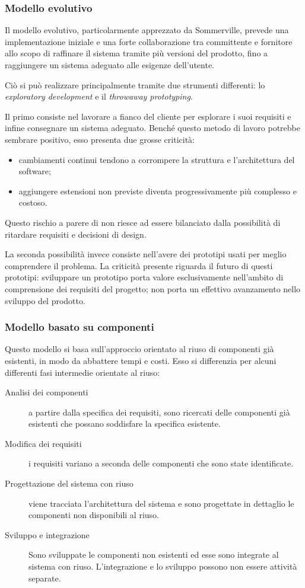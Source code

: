 \subsubsection{Modello evolutivo}
Il modello evolutivo, particolarmente apprezzato da Sommerville, prevede una implementazione iniziale e una forte collaborazione tra committente e fornitore allo scopo di raffinare il sistema tramite più versioni del prodotto, fino a raggiungere un sistema adeguato alle esigenze dell'utente.

Ciò si può realizzare principalmente tramite due strumenti differenti: lo \emph{exploratory development} e il \emph{throwaway prototyping}.

Il primo consiste nel lavorare a fianco del cliente per esplorare i suoi requisiti e infine consegnare un sistema adeguato. Benché questo metodo di lavoro potrebbe sembrare positivo, esso presenta due grosse criticità: 
\begin{itemize}
	\item cambiamenti continui tendono a corrompere la struttura e l'architettura del software;
	\item aggiungere estensioni non previste diventa progressivamente più complesso e costoso. 
\end{itemize}
Questo rischio a parere di \hx{} non riesce ad essere bilanciato dalla possibilità di ritardare requisiti e decisioni di design.

La seconda possibilità invece consiste nell'avere dei prototipi usati per meglio comprendere il problema. La criticità presente riguarda il futuro di questi prototipi: sviluppare un prototipo porta valore esclusivamente nell'ambito di comprensione dei requisiti del progetto; non porta un effettivo avanzamento nello sviluppo del prodotto.

\subsubsection{Modello basato su componenti}
Questo modello si basa sull'approccio orientato al riuso di componenti già esistenti, in modo da abbattere tempi e costi. Esso si differenzia per alcuni differenti fasi intermedie orientate al riuso:
\begin{description}
	\item [Analisi dei componenti] a partire dalla specifica dei requisiti, sono ricercati delle componenti già esistenti che possano soddisfare la specifica esistente.
	\item [Modifica dei requisiti] i requisiti variano a seconda delle componenti che sono state identificate.
	\item [Progettazione del sistema con riuso] viene tracciata l'architettura del sistema e sono progettate in dettaglio le componenti non disponibili al riuso.
	\item [Sviluppo e integrazione] Sono sviluppate le componenti non esistenti ed esse sono integrate al sistema con riuso. L'integrazione e lo sviluppo possono non essere attività separate.
\end{description}


